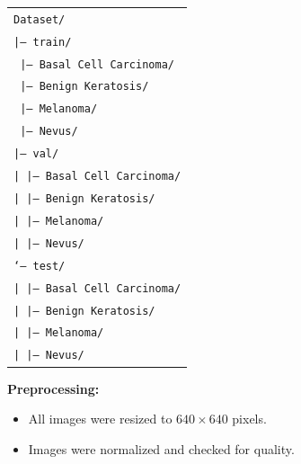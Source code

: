 \documentclass[a4paper,12pt]{report}
\begin{document}
\begin{spacing}{1.5}
    \begin{center}
    \begin{tabular}{l}
    \texttt{Dataset/} \\
    \hspace{0.5cm}\texttt{|-- train/} \\
    \hspace{1cm}\texttt{   |-- Basal Cell Carcinoma/} \\
    \hspace{1cm}\texttt{   |-- Benign Keratosis/} \\
    \hspace{1cm}\texttt{   |-- Melanoma/} \\
    \hspace{1cm}\texttt{   |-- Nevus/} \\
    \hspace{0.5cm}\texttt{|-- val/} \\
    \hspace{1cm}\texttt{|   |-- Basal Cell Carcinoma/} \\
    \hspace{1cm}\texttt{|   |-- Benign Keratosis/} \\
    \hspace{1cm}\texttt{|   |-- Melanoma/} \\
    \hspace{1cm}\texttt{|   |-- Nevus/} \\
    \hspace{0.5cm}\texttt{`-- test/} \\
    \hspace{1cm}\texttt{|   |-- Basal Cell Carcinoma/} \\
    \hspace{1cm}\texttt{|   |-- Benign Keratosis/} \\
    \hspace{1cm}\texttt{|   |-- Melanoma/} \\
    \hspace{1cm}\texttt{|   |-- Nevus/} \\
    \end{tabular}
    \end{center}
    
    \textbf{Preprocessing:}
    \begin{itemize}
        \item All images were resized to $640 \times 640$ pixels.
        \item Images were normalized and checked for quality.
    \end{itemize}
    

\end{spacing}
\end{document}
